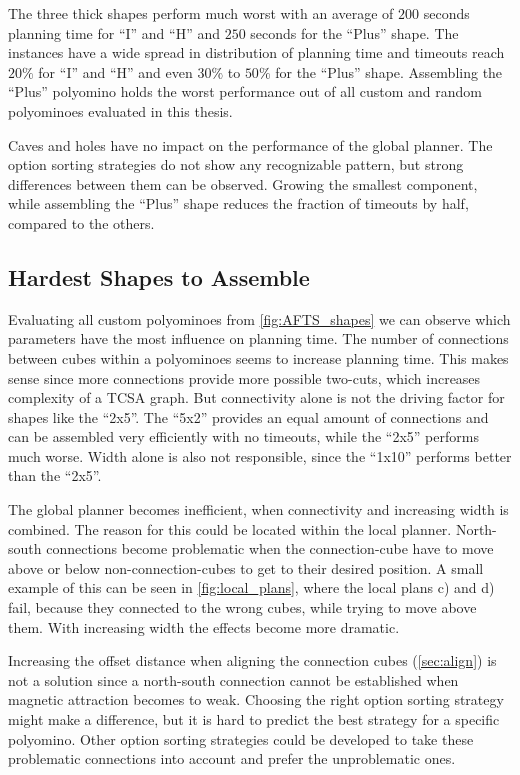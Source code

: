 The three thick shapes perform much worst with an average of $200$ seconds planning time for ``I'' and ``H'' and $250$ seconds for the ``Plus'' shape.
The instances have a wide spread in distribution of planning time and timeouts reach $20\%$ for ``I'' and ``H'' and even $30\%$ to $50\%$ for the ``Plus'' shape.
Assembling the ``Plus'' polyomino holds the worst performance out of all custom and random polyominoes evaluated in this thesis.

Caves and holes have no impact on the performance of the global planner.
The option sorting strategies do not show any recognizable pattern, but strong differences between them can be observed.
Growing the smallest component, while assembling the ``Plus'' shape reduces the fraction of timeouts by half, compared to the others.


\subsection{Hardest Shapes to Assemble}

Evaluating all custom polyominoes from \autoref{fig:AFTS_shapes} we can observe which parameters have the most influence on planning time.
The number of connections between cubes within a polyominoes seems to increase planning time.
This makes sense since more connections provide more possible two-cuts, which increases complexity of a TCSA graph.
But connectivity alone is not the driving factor for shapes like the ``2x5''.
The ``5x2'' provides an equal amount of connections and can be assembled very efficiently with no timeouts, while the ``2x5'' performs much worse.
Width alone is also not responsible, since the ``1x10'' performs better than the ``2x5''.

The global planner becomes inefficient, when connectivity and increasing width is combined.
The reason for this could be located within the local planner.
North-south connections become problematic when the connection-cube have to move above or below non-connection-cubes to get to their desired position.
A small example of this can be seen in \autoref{fig:local_plans}, where the local plans c) and d) fail, because they connected to the wrong cubes, while trying to move above them.
With increasing width the effects become more dramatic.

Increasing the offset distance when aligning the connection cubes (\autoref{sec:align}) is not a solution since a north-south connection cannot be established when magnetic attraction becomes to weak.
Choosing the right option sorting strategy might make a difference, but it is hard to predict the best strategy for a specific polyomino.
Other option sorting strategies could be developed to take these problematic connections into account and prefer the unproblematic ones.



